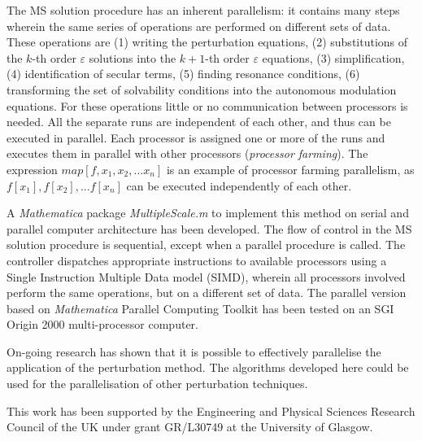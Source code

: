  The MS solution procedure 
has an inherent parallelism: it contains many steps wherein the same series of operations are performed on different sets of data. These operations are 
(1) writing the perturbation equations, (2) substitutions of the $k$-th order 
$\varepsilon$ solutions into the $k+1$-th order $\varepsilon$ equations, (3) simplification,
(4) identification of secular terms, (5) finding resonance conditions, (6) transforming the 
set of solvability conditions into the autonomous modulation 
equations. For these operations little or no communication between processors is needed. All the separate runs are independent of each other, 
and thus can be executed in parallel. Each processor is assigned one 
  or more of the runs and executes them in parallel with other 
  processors ({\it processor farming}). The expression $map[f, {x_1,  x_2, ...x_n}]$ is an example of processor farming 
  parallelism, as $f[x_1], f[x_2],  ... f[x_n]$ can be executed independently of each other. %

A {\it Mathematica} package {\it MultipleScale.m}
to implement this method  on serial and parallel computer architecture has been developed. 
The flow of control in the MS solution procedure is sequential, except when a parallel procedure 
is called.  
The controller dispatches appropriate instructions to available processors using a Single Instruction
 Multiple Data model (SIMD), wherein all processors involved perform the same operations, 
 but on a different set of data. The parallel version based on {\it Mathematica} Parallel Computing Toolkit has been 
tested on an SGI Origin 2000 multi-processor computer. 


	On-going research has shown that it is possible to 
effectively parallelise the application of the perturbation method. 
The algorithms developed here could be used for the 
parallelisation of other perturbation techniques. 

 This work has been supported by the Engineering and Physical Sciences Research Council of the UK under grant GR/L30749 at the University of Glasgow.


 